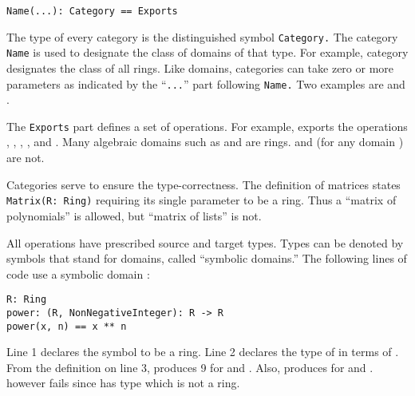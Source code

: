 \begin{verbatim}
Name(...): Category == Exports
\end{verbatim}
The type of every category is the distinguished symbol {\tt Category.}
The category {\tt Name} is used to designate the class of domains of that
type.
For example, category  designates the class of all rings.
Like domains, categories can take zero or more parameters as indicated by the
``{\tt ...}'' part following {\tt Name.}
Two examples are  and .

The {\tt Exports} part defines a set of operations.
For example,  exports the operations
, ,
, , and .
Many algebraic domains such as
 and  are rings.
 and  (for any domain
) are not.

Categories serve to ensure the type-correctness.
The definition of matrices states {\tt Matrix(R:
Ring)} requiring its single parameter  to be a ring.
Thus a ``matrix of polynomials'' is allowed, but
``matrix of lists'' is not.



\par %
All operations have prescribed source and target types.
Types can be denoted by symbols that stand for domains, called
``symbolic domains.''
The following lines of \Language{} code use a symbolic domain :

\begin{verbatim}
R: Ring
power: (R, NonNegativeInteger): R -> R
power(x, n) == x ** n
\end{verbatim}

Line 1 declares the symbol  to be a ring.
Line 2 declares the type of  in terms of .
From the definition on line 3,  produces 9 for
 and
 .
Also,  produces  for
 and  .
 however fails since  has
type  which is not a ring.

